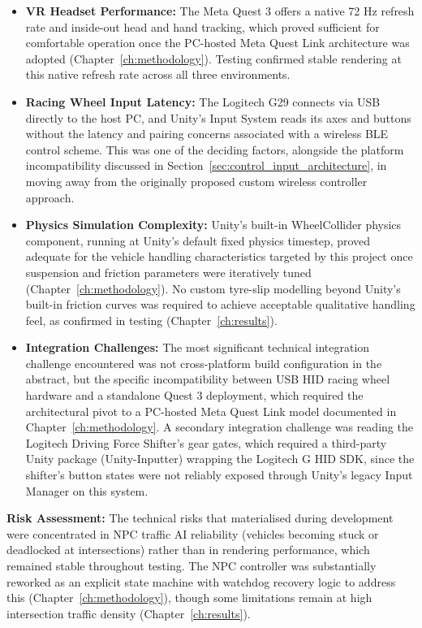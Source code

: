 \begin{itemize}
    \item \textbf{VR Headset Performance:} The Meta Quest 3 offers a native 72 Hz refresh rate and inside-out head and hand tracking, which proved sufficient for comfortable operation once the PC-hosted Meta Quest Link architecture was adopted (Chapter~\ref{ch:methodology}). Testing confirmed stable rendering at this native refresh rate across all three environments.

    \item \textbf{Racing Wheel Input Latency:} The Logitech G29 connects via USB directly to the host PC, and Unity's Input System reads its axes and buttons without the latency and pairing concerns associated with a wireless BLE control scheme. This was one of the deciding factors, alongside the platform incompatibility discussed in Section~\ref{sec:control_input_architecture}, in moving away from the originally proposed custom wireless controller approach.

    \item \textbf{Physics Simulation Complexity:} Unity's built-in WheelCollider physics component, running at Unity's default fixed physics timestep, proved adequate for the vehicle handling characteristics targeted by this project once suspension and friction parameters were iteratively tuned (Chapter~\ref{ch:methodology}). No custom tyre-slip modelling beyond Unity's built-in friction curves was required to achieve acceptable qualitative handling feel, as confirmed in testing (Chapter~\ref{ch:results}).

    \item \textbf{Integration Challenges:} The most significant technical integration challenge encountered was not cross-platform build configuration in the abstract, but the specific incompatibility between USB HID racing wheel hardware and a standalone Quest 3 deployment, which required the architectural pivot to a PC-hosted Meta Quest Link model documented in Chapter~\ref{ch:methodology}. A secondary integration challenge was reading the Logitech Driving Force Shifter's gear gates, which required a third-party Unity package (Unity-Inputter) wrapping the Logitech G HID SDK, since the shifter's button states were not reliably exposed through Unity's legacy Input Manager on this system.
\end{itemize}

\textbf{Risk Assessment:} The technical risks that materialised during development were concentrated in NPC traffic AI reliability (vehicles becoming stuck or deadlocked at intersections) rather than in rendering performance, which remained stable throughout testing. The NPC controller was substantially reworked as an explicit state machine with watchdog recovery logic to address this (Chapter~\ref{ch:methodology}), though some limitations remain at high intersection traffic density (Chapter~\ref{ch:results}).

